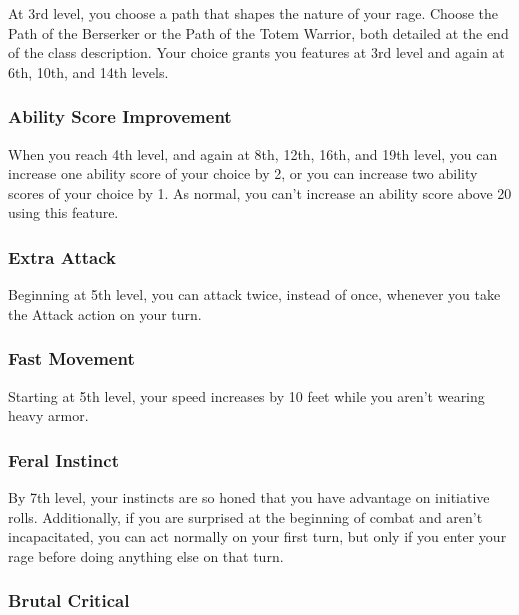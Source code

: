 \documentclass[
]{article}
\begin{document}
At 3rd level, you choose a path that shapes the nature of your rage.
Choose the Path of the Berserker or the Path of the Totem Warrior, both
detailed at the end of the class description. Your choice grants you
features at 3rd level and again at 6th, 10th, and 14th levels.

\hypertarget{ability-score-improvement}{%
\subsubsection{Ability Score
Improvement}\label{ability-score-improvement}}

When you reach 4th level, and again at 8th, 12th, 16th, and 19th level,
you can increase one ability score of your choice by 2, or you can
increase two ability scores of your choice by 1. As normal, you can't
increase an ability score above 20 using this feature.

\hypertarget{extra-attack}{%
\subsubsection{Extra Attack}\label{extra-attack}}

Beginning at 5th level, you can attack twice, instead of once, whenever
you take the Attack action on your turn.

\hypertarget{fast-movement}{%
\subsubsection{Fast Movement}\label{fast-movement}}

Starting at 5th level, your speed increases by 10 feet while you aren't
wearing heavy armor.

\hypertarget{feral-instinct}{%
\subsubsection{Feral Instinct}\label{feral-instinct}}

By 7th level, your instincts are so honed that you have advantage on
initiative rolls. Additionally, if you are surprised at the beginning of
combat and aren't incapacitated, you can act normally on your first
turn, but only if you enter your rage before doing anything else on that
turn.

\hypertarget{brutal-critical}{%
\subsubsection{Brutal Critical}\label{brutal-critical}}
\end{document}
